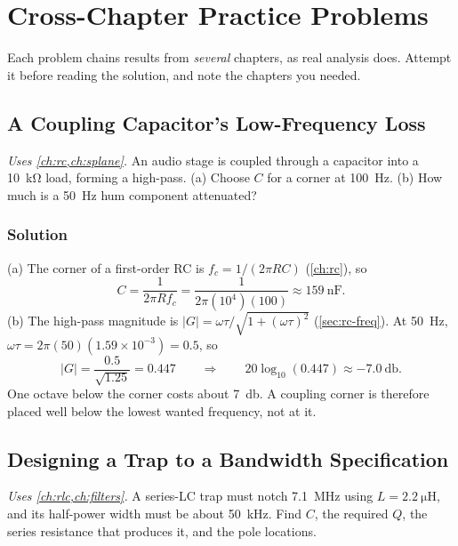 \chapter{Cross-Chapter Practice Problems}
\label{ch:crossproblems}
Each problem chains results from \emph{several} chapters, as real analysis does.
Attempt it before reading the solution, and note the chapters you needed.

\section{A Coupling Capacitor's Low-Frequency Loss}
\emph{Uses \cref{ch:rc,ch:splane}.} An audio stage is coupled through a capacitor into
a \SI{10}{\kilo\ohm} load, forming a high-pass. (a) Choose \(C\) for a corner at
\SI{100}{\hertz}. (b) How much is a \SI{50}{\hertz} hum component attenuated?

\subsection*{Solution}
(a) The corner of a first-order RC is \(f_c=1/(2\pi RC)\)
(\cref{ch:rc}), so
\[
C=\frac{1}{2\pi R f_c}=\frac{1}{2\pi(10^4)(100)}\approx\SI{159}{\nano\farad}.
\]
(b) The high-pass magnitude is \(|G|=\omega\tau/\sqrt{1+(\omega\tau)^2}\)
(\cref{sec:rc-freq}). At \SI{50}{\hertz}, \(\omega\tau=2\pi(50)(1.59\times10^{-3})=0.5\), so
\[
|G|=\frac{0.5}{\sqrt{1.25}}=0.447
\qquad\Longrightarrow\qquad
20\log_{10}(0.447)\approx-\SI{7.0}{\decibel}.
\]
One octave below the corner costs about \SI{7}{\decibel}. A coupling corner is
therefore placed well below the lowest wanted frequency, not at it.

\section{Designing a Trap to a Bandwidth Specification}
\emph{Uses \cref{ch:rlc,ch:filters}.} A series-LC trap must notch
\SI{7.1}{\mega\hertz} using \(L=\SI{2.2}{\micro\henry}\), and its half-power width
must be about \SI{50}{\kilo\hertz}. Find \(C\), the required \(Q\), the series
resistance that produces it, and the pole locations.

